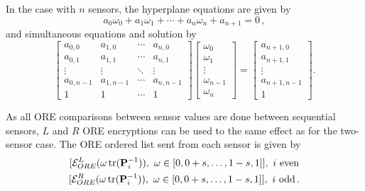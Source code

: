 \documentclass[letterpaper, 10 pt, conference]{ieeeconf}  %
\begin{document}
In the case with $n$ sensors, the hyperplane equations are given by
\begin{equation}
   a_0\omega_0 + a_1\omega_1 + \cdots + a_n\omega_n + a_{n+1} = 0\,, \label{eqn:hyperplane_eq}
\end{equation}
and simultaneous equations and solution by
\begin{equation}
   \begin{bmatrix}
      a_{0,0} & a_{1,0} & \cdots & a_{n,0} \\
      a_{0,1} & a_{1,1} & \cdots & a_{n,1} \\
      \vdots & \vdots & \ddots & \vdots \\
      a_{0,n-1} & a_{1,n-1} & \cdots & a_{n,n-1} \\
      1 & 1 & \cdots & 1
   \end{bmatrix}
   \begin{bmatrix}
      \omega_0 \\
      \omega_1 \\
      \vdots \\
      \omega_{n-1} \\
      \omega_n
   \end{bmatrix}
   =
   \begin{bmatrix}
      a_{n+1,0} \\
      a_{n+1,1} \\
      \vdots \\
      a_{n+1,n-1} \\
      1
   \end{bmatrix}. \label{eqn:hyperplane_sol_eq}
\end{equation}

As all ORE comparisons between sensor values are done between sequential sensors, $L$ and $R$ ORE encryptions can be used to the same effect as for the two-sensor case. The ORE ordered list sent from each sensor is given by
\begin{equation}
   \begin{gathered} \label{eqn:sensor_lists}
      [\mathcal{E}^L_{ORE}(\omega\tr(\mP^{-1}_i)),\ \omega \in [0,0+s,\dots,1-s,1]],\ i\text{ even} \\
      [\mathcal{E}^R_{ORE}(\omega\tr(\mP^{-1}_i)),\ \omega \in [0,0+s,\dots,1-s,1]],\ i\text{ odd}\,.
   \end{gathered}
\end{equation}

\end{document}
